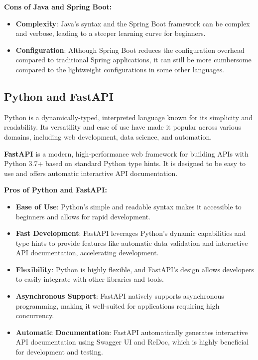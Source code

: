 \textbf{Cons of Java and Spring Boot:}
\begin{itemize}
    \item \textbf{Complexity}: Java's syntax and the Spring Boot framework can be complex and verbose, leading to a steeper learning curve for beginners.
    \item \textbf{Configuration}: Although Spring Boot reduces the configuration overhead compared to traditional Spring applications, it can still be more cumbersome compared to the lightweight configurations in some other languages.
\end{itemize}

\subsection{Python and FastAPI}

Python is a dynamically-typed, interpreted language known for its simplicity and readability. Its versatility and ease of use have made it popular across various domains, including web development, data science, and automation.

\textbf{FastAPI} is a modern, high-performance web framework for building APIs with Python 3.7+ based on standard Python type hints. It is designed to be easy to use and offers automatic interactive API documentation.

\textbf{Pros of Python and FastAPI:}
\begin{itemize}
    \item \textbf{Ease of Use}: Python's simple and readable syntax makes it accessible to beginners and allows for rapid development.
    \item \textbf{Fast Development}: FastAPI leverages Python's dynamic capabilities and type hints to provide features like automatic data validation and interactive API documentation, accelerating development.
    \item \textbf{Flexibility}: Python is highly flexible, and FastAPI's design allows developers to easily integrate with other libraries and tools.
    \item \textbf{Asynchronous Support}: FastAPI natively supports asynchronous programming, making it well-suited for applications requiring high concurrency.
    \item \textbf{Automatic Documentation}: FastAPI automatically generates interactive API documentation using Swagger UI and ReDoc, which is highly beneficial for development and testing.
\end{itemize}

